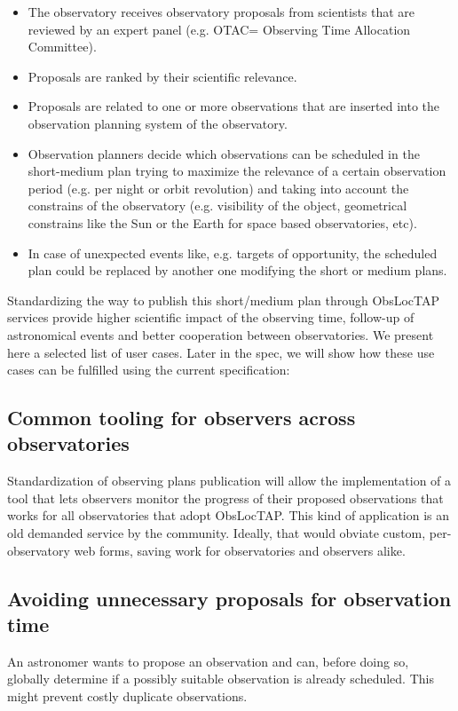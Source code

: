 \documentclass[11pt,a4paper]{ivoa}
\begin{document}
\begin{itemize}
	\item The observatory receives observatory proposals from scientists that are reviewed by an expert panel (e.g. OTAC= Observing Time Allocation Committee). \par

	\item Proposals are ranked by their scientific relevance.

	\item Proposals are related to one or more observations that are inserted into the observation planning system of the observatory.

	\item Observation planners decide which observations can be scheduled in the short-medium plan trying to maximize the relevance of a certain observation period (e.g. per night or orbit revolution) and taking into account the constrains of the observatory (e.g. visibility of the object, geometrical constrains like the Sun or the Earth for space based observatories, etc).

	\item In case of unexpected events like, e.g. targets of opportunity, the scheduled plan could be replaced by another one modifying the short or medium plans.
\end{itemize}

Standardizing the way to publish this short/medium plan through ObsLocTAP services provide higher scientific impact of the observing time, follow-up of astronomical events and better cooperation between observatories. We present here a selected list of user cases. Later in the spec, we will show how these use cases can be fulfilled using the current specification:

\subsection{Common tooling for observers across observatories}
Standardization of observing plans publication will allow the implementation of a tool that lets observers monitor the progress of their proposed observations that works for all observatories that adopt ObsLocTAP. This kind of application is an old demanded service by the community. Ideally, that would obviate custom, per-observatory web forms, saving work for observatories and observers alike. 

\subsection{Avoiding unnecessary proposals for observation time}
An astronomer wants to propose an observation and can, before doing so, globally determine if a possibly suitable observation is already scheduled.  This might prevent costly duplicate observations. 
\end{document}
